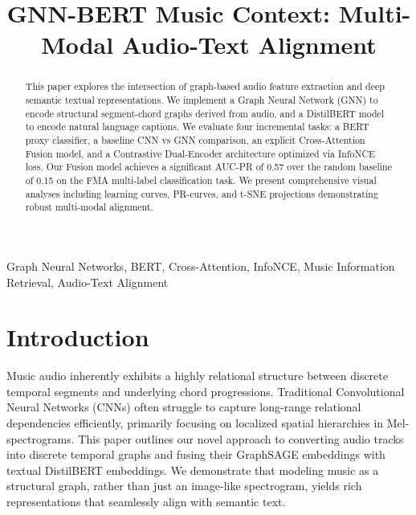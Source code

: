 \documentclass[conference]{IEEEtran}
\begin{document}
\title{GNN-BERT Music Context: Multi-Modal Audio-Text Alignment}

\author{
}

\maketitle

\begin{abstract}
This paper explores the intersection of graph-based audio feature extraction and deep semantic textual representations. We implement a Graph Neural Network (GNN) to encode structural segment-chord graphs derived from audio, and a DistilBERT model to encode natural language captions. We evaluate four incremental tasks: a BERT proxy classifier, a baseline CNN vs GNN comparison, an explicit Cross-Attention Fusion model, and a Contrastive Dual-Encoder architecture optimized via InfoNCE loss. Our Fusion model achieves a significant AUC-PR of 0.57 over the random baseline of 0.15 on the FMA multi-label classification task. We present comprehensive visual analyses including learning curves, PR-curves, and t-SNE projections demonstrating robust multi-modal alignment.
\end{abstract}

\begin{IEEEkeywords}
Graph Neural Networks, BERT, Cross-Attention, InfoNCE, Music Information Retrieval, Audio-Text Alignment
\end{IEEEkeywords}

\section{Introduction}
Music audio inherently exhibits a highly relational structure between discrete temporal segments and underlying chord progressions. Traditional Convolutional Neural Networks (CNNs) often struggle to capture long-range relational dependencies efficiently, primarily focusing on localized spatial hierarchies in Mel-spectrograms. This paper outlines our novel approach to converting audio tracks into discrete temporal graphs and fusing their GraphSAGE embeddings with textual DistilBERT embeddings. We demonstrate that modeling music as a structural graph, rather than just an image-like spectrogram, yields rich representations that seamlessly align with semantic text.
\end{document}
